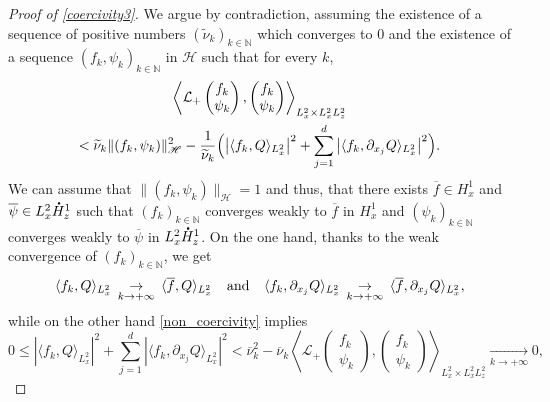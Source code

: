 \documentclass[JEP,XML,SOM,NoEqCountersInSection,NoFloatCountersInSection,Unicode,published]{cedram}
\let\bar\oldbar
\let\tilde\oldtilde
\theoremstyle{definition}
\newcommand*{\overbigdot}[1]{%
\accentset{\mbox{\large\bfseries .}}{#1}}
\let\bar\overline
\let\tilde\widetilde
\newenvironment{ProofOf}[1]{\begin{proof}[Proof of #1]}{\end{proof}}
\begin{document}
\begin{ProofOf}{\eqref{coercivity3}}
We argue by contradiction, assuming the existence of a sequence of positive numbers $(\tilde{\nu}_{k})_{k\in\mathbb N}$ which converges to $0$ and the existence of a sequence $(f_{k},\psi_{k})_{k\in\mathbb N}$ in $\mathscr{H}$ such that for every $k$,
\begin{multline}\label{non_coercivity}
\left\langle\mathcal{L}_{+}\begin{pmatrix} f_{k}\\\psi_{k} \end{pmatrix},\begin{pmatrix} f_{k}\\\psi_{k} \end{pmatrix}\right\rangle_{L_{x}^{2}\times L_{x}^{2}L_{z}^{2}}
\\
<\tilde{\nu}_{k}\|(f_{k},\psi_{k})\|_{\mathscr{H}}^{2}-\frac{1}{\tilde{\nu}_{k}}\Bigl(\left|\langle f_{k},Q\rangle_{L_{x}^{2}}\right|^{2}+\sum\limits_{j=1}^{d}\left|\langle f_{k},\partial_{x_{j}}Q\rangle_{L_{x}^{2}}\right|^{2}\Bigr).
\end{multline}
We can assume that $\| (f_{k},\psi_{k})\|_{\mathscr{H}}=1$ and thus, that there exists $\bar{f}\in H_{x}^{1}$ and $\bar{\psi}\in L_{x}^{2}\overbigdot{H}_{z}^{1}$ such that $(f_{k})_{k\in\mathbb N}$ converges weakly to $\bar{f}$ in $H_{x}^{1}$ and $(\psi_{k})_{k\in\mathbb N}$ converges weakly to $\bar{\psi}$ in $L_{x}^{2}\overbigdot{H}_{z}^{1}$. On the one hand, thanks to the weak convergence of $(f_{k})_{k\in\mathbb N}$, we get
\[
\langle f_{k},Q\rangle_{L_{x}^{2}}\,\underset{k\to+\infty}{\to}\,\langle\bar{f},Q\rangle_{L_{x}^{2}} \hspace{0.25cm}\text{ and }\hspace{0.25cm} \langle f_{k},\partial_{x_{j}}Q\rangle_{L_{x}^{2}}\,\underset{k\to+\infty}{\to}\,\langle\bar{f},\partial_{x_{j}}Q\rangle_{L_{x}^{2}},
\]
while on the other hand \eqref{non_coercivity} implies
\[
0\leq\left|\langle f_{k},Q\rangle_{L_{x}^{2}}\right|^{2}+\sum\limits_{j=1}^{d}\left|\langle f_{k},\partial_{x_{j}}Q\rangle_{L_{x}^{2}}\right|^{2}<\bar{\nu}_{k}^{2}-\bar{\nu}_{k}\left\langle\mathcal{L}_{+}\begin{pmatrix} f_{k}\\\psi_{k} \end{pmatrix},\begin{pmatrix} f_{k}\\\psi_{k} \end{pmatrix}\right\rangle_{L_{x}^{2}\times L_{x}^{2}L_{z}^{2}}\underset{k\to+\infty}{\to}0,
\]
\end{ProofOf}
\end{document}
